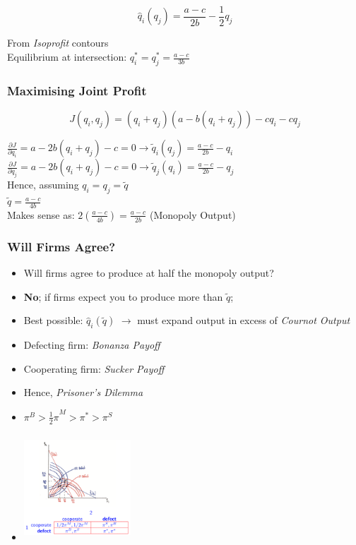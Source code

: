 \documentclass[11pt, english]{article}
\begin{document}
	$${\hat{q}}_i\left(q_j\right)=\frac{a-c}{2b}-\frac{1}{2}q_j$$
	
	From \textit{Isoprofit} contours\\
	Equilibrium at intersection: $q_i^\ast=q_j^\ast=\frac{a-c}{3b}$

		\subsubsection{Maximising Joint Profit}

	$$J\left(q_i,q_j\right)=\left(q_i+q_j\right)\left(a-b(q_i+q_j)\right)-{cq}_i-{cq}_j$$

	$\frac{\partial J}{\partial q_i}=a-2b\left(q_i+q_j\right)-c=0\rightarrow{\widetilde{q}}_i\left(q_j\right)=\frac{a-c}{2b}-q_i$\\
	$\frac{\partial J}{\partial q_j}=a-2b\left(q_i+q_j\right)-c=0\rightarrow{\widetilde{q}}_j\left(q_i\right)=\frac{a-c}{2b}-q_j$\\

	Hence, assuming $q_i=q_j=\widetilde{q}$\\
	$\widetilde{q}=\frac{a-c}{4b}$\\
	Makes sense as: $2\left(\frac{a-c}{4b}\right)=\frac{a-c}{2b}$ (Monopoly Output)

		\subsubsection{Will Firms Agree?}

	\begin{itemize}
	\setlength\itemsep{0cm}
		\item Will firms agree to produce at half the monopoly output?
		\item \textbf{No}; if firms expect you to produce more than $\widetilde{q}$;
		\item Best possible: ${\hat{q}}_i(\widetilde{q})$ $\rightarrow$ must expand output in excess of \textit{Cournot Output}
		\item Defecting firm: \textit{Bonanza Payoff}
		\item Cooperating firm: \textit{Sucker Payoff}
		\item Hence, \textit{Prisoner's Dilemma}
		\item $\pi^B>{\frac{1}{2}\pi}^M>\pi^\ast>\pi^S$
		\item \includegraphics[width=4cm,height=4cm]{EC315-IMG/20.png}
	\end{itemize}
\end{document}
